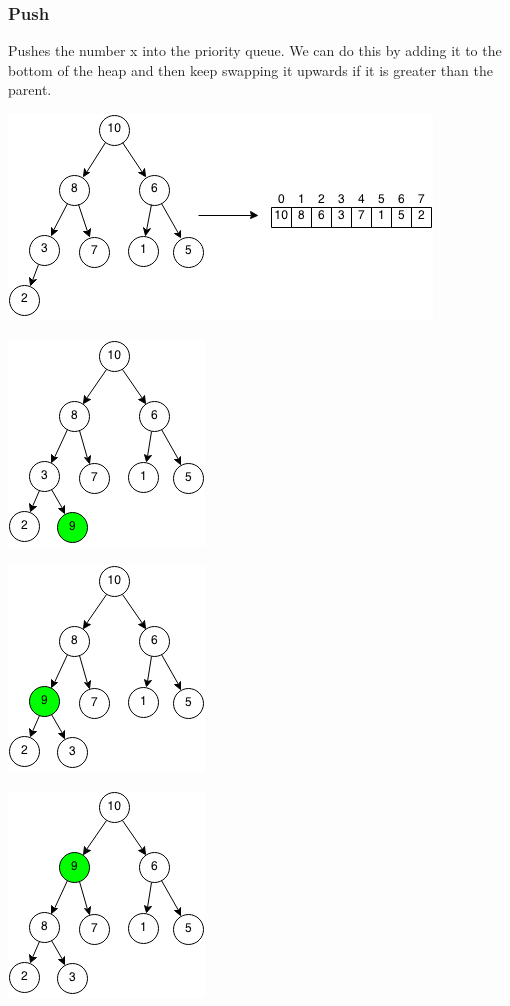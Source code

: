 \documentclass[11pt,oneside]{book}
\makeatletter
\def\maxwidth#1{\ifdim\Gin@nat@width>#1 #1\else\Gin@nat@width\fi}
\makeatother
\begin{document}
\subsubsection{Push}

Pushes the number x into the priority queue. We can do this by adding it to the bottom of the heap and then keep swapping it upwards if it is greater than the parent.

\vspace{5px}\includegraphics[width=\maxwidth{\textwidth}]{maxheap.png}

\vspace{5px}\includegraphics[width=\maxwidth{\textwidth}]{maxheappush.png}

\vspace{5px}\includegraphics[width=\maxwidth{\textwidth}]{maxheappush2.png}

\vspace{5px}\includegraphics[width=\maxwidth{\textwidth}]{maxheappush3.png}
\end{document}
